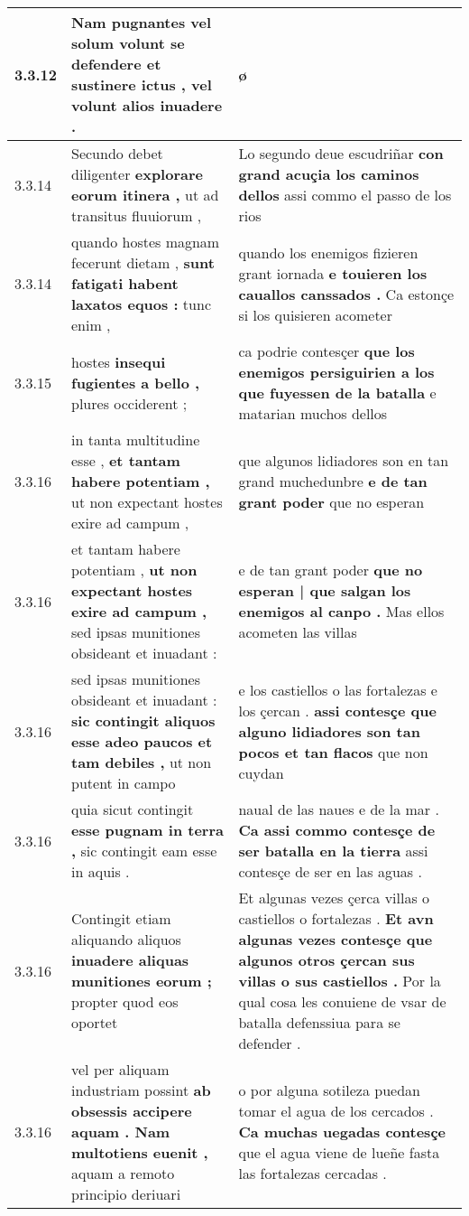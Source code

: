 \begin{tabular}{|p{1cm}|p{6.5cm}|p{6.5cm}|}
3.3.12 & Nam pugnantes vel solum volunt se defendere \textbf{ et sustinere ictus , } vel volunt alios inuadere . & ø \\\hline
3.3.14 & Secundo debet diligenter \textbf{ explorare eorum itinera , } ut ad transitus fluuiorum , & Lo segundo deue escudriñar \textbf{ con grand acuçia los caminos dellos } assi commo el passo de los rios \\\hline
3.3.14 & quando hostes magnam fecerunt dietam , \textbf{ sunt fatigati habent laxatos equos : } tunc enim , & quando los enemigos fizieren grant iornada \textbf{ e touieren los cauallos canssados . } Ca estonçe si los quisieren acometer \\\hline
3.3.15 & hostes \textbf{ insequi fugientes a bello , } plures occiderent ; & ca podrie contesçer \textbf{ que los enemigos persiguirien a los que fuyessen de la batalla } e matarian muchos dellos \\\hline
3.3.16 & in tanta multitudine esse , \textbf{ et tantam habere potentiam , } ut non expectant hostes exire ad campum , & que algunos lidiadores son en tan grand muchedunbre \textbf{ e de tan grant poder } que no esperan \\\hline
3.3.16 & et tantam habere potentiam , \textbf{ ut non expectant hostes exire ad campum , } sed ipsas munitiones obsideant et inuadant : & e de tan grant poder \textbf{ que no esperan | que salgan los enemigos al canpo . } Mas ellos acometen las villas \\\hline
3.3.16 & sed ipsas munitiones obsideant et inuadant : \textbf{ sic contingit aliquos esse adeo paucos et tam debiles , } ut non putent in campo & e los castiellos o las fortalezas e los çercan . \textbf{ assi contesçe que alguno lidiadores son tan pocos et tan flacos } que non cuydan \\\hline
3.3.16 & quia sicut contingit \textbf{ esse pugnam in terra , } sic contingit eam esse in aquis . & naual de las naues e de la mar . \textbf{ Ca assi commo contesçe de ser batalla en la tierra } assi contesçe de ser en las aguas . \\\hline
3.3.16 & Contingit etiam aliquando aliquos \textbf{ inuadere aliquas munitiones eorum ; } propter quod eos oportet & Et algunas vezes çerca villas o castiellos o fortalezas . \textbf{ Et avn algunas vezes contesçe que algunos otros çercan sus villas o sus castiellos . } Por la qual cosa les conuiene de vsar de batalla defenssiua para se defender . \\\hline
3.3.16 & vel per aliquam industriam possint \textbf{ ab obsessis accipere aquam . Nam multotiens euenit , } aquam a remoto principio deriuari & o por alguna sotileza puedan tomar el agua de los cercados . \textbf{ Ca muchas uegadas contesçe } que el agua viene de lueñe fasta las fortalezas cercadas . \\\hline

\end{tabular}
